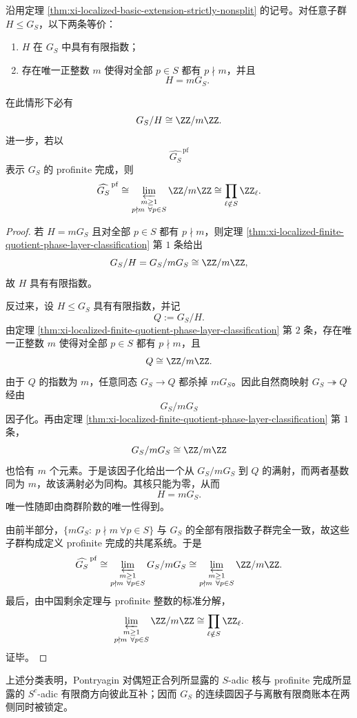 \begin{theorem}\label{thm:xi-localized-finite-index-profinite-completion-classification}
沿用定理 \ref{thm:xi-localized-basic-extension-strictly-nonsplit} 的记号。对任意子群 \(H\le G_S\)，以下两条等价：
\begin{enumerate}
  \item \(H\) 在 \(G_S\) 中具有有限指数；
  \item 存在唯一正整数 \(m\) 使得对全部 \(p\in S\) 都有 \(p\nmid m\)，并且
  \[
  H=mG_S.
  \]
\end{enumerate}
在此情形下必有
\[
G_S/H\cong \ZZ/m\ZZ.
\]
进一步，若以
\[
\widehat{G_S}^{\,\mathrm{pf}}
\]
表示 \(G_S\) 的 profinite 完成，则
\[
\widehat{G_S}^{\,\mathrm{pf}}
\cong
\varprojlim_{\substack{m\ge 1\\ p\nmid m\ \forall p\in S}}\ZZ/m\ZZ
\cong
\prod_{\ell\notin S}\ZZ_\ell.
\]
\end{theorem}
\begin{proof}
若 \(H=mG_S\) 且对全部 \(p\in S\) 都有 \(p\nmid m\)，则定理 \ref{thm:xi-localized-finite-quotient-phase-layer-classification} 第 \(1\) 条给出
\[
G_S/H=G_S/mG_S\cong \ZZ/m\ZZ,
\]
故 \(H\) 具有有限指数。

反过来，设 \(H\le G_S\) 具有有限指数，并记
\[
Q:=G_S/H.
\]
由定理 \ref{thm:xi-localized-finite-quotient-phase-layer-classification} 第 \(2\) 条，存在唯一正整数 \(m\) 使得对全部 \(p\in S\) 都有 \(p\nmid m\)，且
\[
Q\cong \ZZ/m\ZZ.
\]
由于 \(Q\) 的指数为 \(m\)，任意同态 \(G_S\to Q\) 都杀掉 \(mG_S\)。因此自然商映射 \(G_S\twoheadrightarrow Q\) 经由
\[
G_S/mG_S
\]
因子化。再由定理 \ref{thm:xi-localized-finite-quotient-phase-layer-classification} 第 \(1\) 条，
\[
G_S/mG_S\cong \ZZ/m\ZZ
\]
也恰有 \(m\) 个元素。于是该因子化给出一个从 \(G_S/mG_S\) 到 \(Q\) 的满射，而两者基数同为 \(m\)，故该满射必为同构。其核只能为零，从而
\[
H=mG_S.
\]
唯一性随即由商群阶数的唯一性得到。

由前半部分，\(\{mG_S:\ p\nmid m\ \forall p\in S\}\) 与 \(G_S\) 的全部有限指数子群完全一致，故这些子群构成定义 profinite 完成的共尾系统。于是
\[
\widehat{G_S}^{\,\mathrm{pf}}
\cong
\varprojlim_{\substack{m\ge 1\\ p\nmid m\ \forall p\in S}}G_S/mG_S
\cong
\varprojlim_{\substack{m\ge 1\\ p\nmid m\ \forall p\in S}}\ZZ/m\ZZ.
\]
最后，由中国剩余定理与 profinite 整数的标准分解，
\[
\varprojlim_{\substack{m\ge 1\\ p\nmid m\ \forall p\in S}}\ZZ/m\ZZ
\cong
\prod_{\ell\notin S}\ZZ_\ell.
\]
证毕。
\end{proof}

上述分类表明，Pontryagin 对偶短正合列所显露的 \(S\)-adic 核与 profinite 完成所显露的 \(S^c\)-adic 有限商方向彼此互补；因而 \(G_S\) 的连续圆因子与离散有限商账本在两侧同时被锁定。

\endinput

